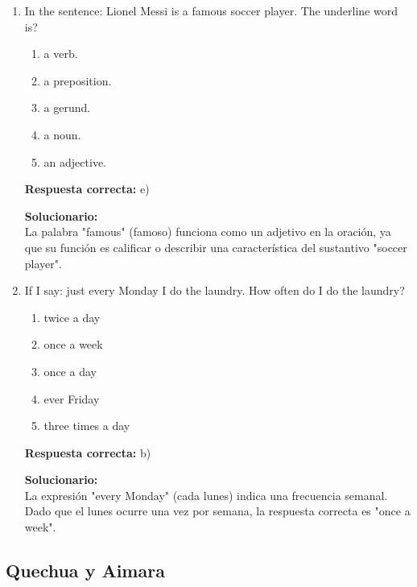 \begin{enumerate}

\item In the sentence: Lionel Messi is a famous soccer player.
The underline word is?

\begin{enumerate}[label=\alph*)]
	\item a verb.
	\item a preposition.
	\item a gerund.
	\item a noun.
	\item an adjective.
\end{enumerate}

\textbf{Respuesta correcta:} e)

\vspace{2mm}
\textbf{Solucionario:}\\
La palabra "famous" (famoso) funciona como un adjetivo en la oración, ya que su función es calificar o describir una característica del sustantivo "soccer player".

\vspace{6mm}

\item If I say: just every Monday I do the laundry.
How often do I do the laundry?

\begin{enumerate}[label=\alph*)]
	\item twice a day
	\item once a week
	\item once a day
	\item ever Friday
	\item three times a day
\end{enumerate}

\textbf{Respuesta correcta:} b)

\vspace{2mm}
\textbf{Solucionario:}\\
La expresión "every Monday" (cada lunes) indica una frecuencia semanal. Dado que el lunes ocurre una vez por semana, la respuesta correcta es "once a week".

\vspace{6mm}
\end{enumerate}





\subsection*{Quechua y Aimara}


